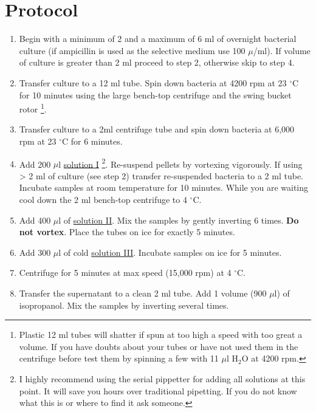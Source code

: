 \documentclass[12pt]{article}
\theoremstyle{definition}
\begin{document}
\pagebreak

\section*{Protocol}


\begin{enumerate}
	\item Begin with a minimum of 2 and a maximum of 6 ml of overnight bacterial culture (if ampicillin is used as the selective medium use 100 $\mu$/ml). If volume of culture is greater than 2 ml proceed to step 2, otherwise skip to step 4.
	
	\item Transfer culture to a 12 ml tube. Spin down bacteria at 4200 rpm at 23 $^{\circ}$C for 10 minutes using the large bench-top centrifuge and the swing bucket rotor \footnote{Plastic 12 ml tubes will shatter if spun at too high a speed with too great a volume. If you have doubts about your tubes or have not used them in the centrifuge before test them by spinning a few with 11 $\mu$l H$_{2}$O at 4200 rpm.}.
	
	\item Transfer culture to a 2ml centrifuge tube and spin down bacteria at 6,000 rpm at 23 $^{\circ}$C for 6 minutes.
	
	\item Add 200 $\mu$l \hyperref[sec:sol-1]{solution I} \footnote{I highly recommend using the serial pippetter for adding all solutions at this point. It will save you hours over traditional pipetting. If you do not know what this is or where to find it ask someone.}. 
	Re-suspend pellets by vortexing vigorously. If using > 2 ml of culture (see step 2) transfer
	re-suspended bacteria to a 2 ml tube. Incubate samples at room temperature for 10 minutes. While you are waiting cool down the 2 ml bench-top centrifuge to 4  $^{\circ}$C.
	
	\item Add 400 $\mu$l of \hyperref[sec:sol-2]{solution II}. Mix the samples by gently
	inverting 6 times. \textbf{Do not vortex}. Place the tubes on ice for exactly 5 minutes.
	
	\item Add 300 $\mu$l of cold \hyperref[sec:sol-3]{solution III}. Incubate samples on ice for 5 minutes.
	
	\item Centrifuge for 5 minutes at max speed (15,000 rpm) at 4  $^{\circ}$C.
	
	\item Transfer the supernatant to a clean 2 ml tube. Add 1 volume (900 $\mu$l) of isopropanol. Mix the samples by inverting several times.
	

\end{enumerate}
\end{document}
